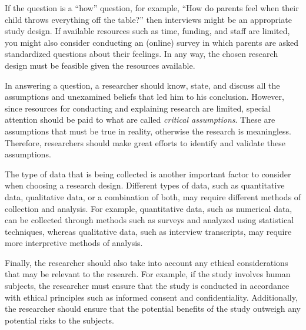 \documentclass[
  12pt,
  oneside]{book}
\theoremstyle{definition}
\theoremstyle{definition}
\theoremstyle{definition}
\theoremstyle{definition}
\theoremstyle{remark}
\begin{document}
If the question is a ``how'' question, for example, ``How do parents feel when their child throws everything off the table?'' then interviews might be an appropriate study design. If available resources such as time, funding, and staff are limited, you might also consider conducting an (online) survey in which parents are asked standardized questions about their feelings. In any way, the chosen research design must be feasible given the resources available.

In answering a question, a researcher should know, state, and discuss all the assumptions and unexamined beliefs that led him to his conclusion. However, since resources for conducting and explaining research are limited, special attention should be paid to what are called \emph{critical assumptions}. These are assumptions that must be true in reality, otherwise the research is meaningless. Therefore, researchers should make great efforts to identify and validate these assumptions.

The type of data that is being collected is another important factor to consider when choosing a research design. Different types of data, such as quantitative data, qualitative data, or a combination of both, may require different methods of collection and analysis. For example, quantitative data, such as numerical data, can be collected through methods such as surveys and analyzed using statistical techniques, whereas qualitative data, such as interview transcripts, may require more interpretive methods of analysis.

Finally, the researcher should also take into account any ethical considerations that may be relevant to the research. For example, if the study involves human subjects, the researcher must ensure that the study is conducted in accordance with ethical principles such as informed consent and confidentiality. Additionally, the researcher should ensure that the potential benefits of the study outweigh any potential risks to the subjects.
\end{document}
